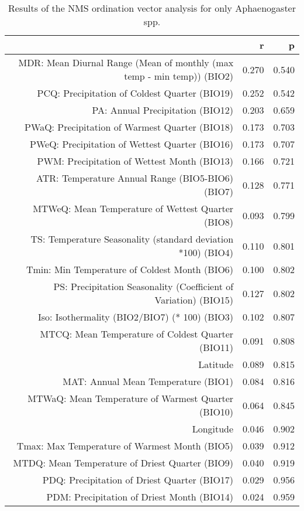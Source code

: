 \begin{table}[ht]
\centering
\begin{tabular}{rrr}
  \hline
 & r & p \\ 
  \hline
MDR: Mean Diurnal Range (Mean of monthly (max temp - min temp)) (BIO2) & 0.270 & 0.540 \\ 
  PCQ: Precipitation of Coldest Quarter (BIO19) & 0.252 & 0.542 \\ 
  PA: Annual Precipitation (BIO12) & 0.203 & 0.659 \\ 
  PWaQ: Precipitation of Warmest Quarter (BIO18) & 0.173 & 0.703 \\ 
  PWeQ: Precipitation of Wettest Quarter (BIO16) & 0.173 & 0.707 \\ 
  PWM: Precipitation of Wettest Month (BIO13) & 0.166 & 0.721 \\ 
  ATR: Temperature Annual Range (BIO5-BIO6) (BIO7) & 0.128 & 0.771 \\ 
  MTWeQ: Mean Temperature of Wettest Quarter (BIO8) & 0.093 & 0.799 \\ 
  TS: Temperature Seasonality (standard deviation *100) (BIO4) & 0.110 & 0.801 \\ 
  Tmin: Min Temperature of Coldest Month (BIO6) & 0.100 & 0.802 \\ 
  PS: Precipitation Seasonality (Coefficient of Variation) (BIO15) & 0.127 & 0.802 \\ 
  Iso: Isothermality (BIO2/BIO7) (* 100) (BIO3) & 0.102 & 0.807 \\ 
  MTCQ: Mean Temperature of Coldest Quarter (BIO11) & 0.091 & 0.808 \\ 
  Latitude & 0.089 & 0.815 \\ 
  MAT: Annual Mean Temperature (BIO1) & 0.084 & 0.816 \\ 
  MTWaQ: Mean Temperature of Warmest Quarter (BIO10) & 0.064 & 0.845 \\ 
  Longitude & 0.046 & 0.902 \\ 
  Tmax: Max Temperature of Warmest Month (BIO5) & 0.039 & 0.912 \\ 
  MTDQ: Mean Temperature of Driest Quarter (BIO9) & 0.040 & 0.919 \\ 
  PDQ: Precipitation of Driest Quarter (BIO17) & 0.029 & 0.956 \\ 
  PDM: Precipitation of Driest Month (BIO14) & 0.024 & 0.959 \\ 
   \hline
\end{tabular}
\caption{Results of the NMS ordination vector analysis for only Aphaenogaster spp.} 
\label{tab:wc_apg_vec}
\end{table}
